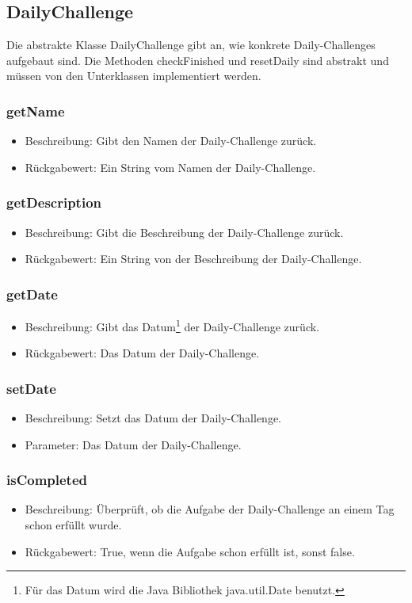 \documentclass[a4paper]{scrreprt}
\begin{document}
	\subsection{DailyChallenge}
	Die abstrakte Klasse DailyChallenge gibt an, wie konkrete Daily-Challenges aufgebaut sind. Die Methoden checkFinished und resetDaily sind abstrakt und müssen von den Unterklassen implementiert werden. \\

	\subsubsection{getName}
	\begin{itemize}
		\item Beschreibung: Gibt den Namen der Daily-Challenge zurück.
		\item Rückgabewert: Ein String vom Namen der Daily-Challenge.
	\end{itemize}
	\subsubsection{getDescription}
	\begin{itemize}
		\item Beschreibung: Gibt die Beschreibung der Daily-Challenge zurück.
		\item Rückgabewert: Ein String von der Beschreibung der Daily-Challenge.
	\end{itemize}
	\subsubsection{getDate}
	\begin{itemize}
		\item Beschreibung: Gibt das Datum\footnote{Für das Datum wird die Java Bibliothek java.util.Date benutzt.} der Daily-Challenge zurück.
		\item Rückgabewert: Das Datum der Daily-Challenge.
	\end{itemize}
	\subsubsection{setDate}
	\begin{itemize}
		\item Beschreibung: Setzt das Datum der Daily-Challenge.
		\item Parameter: Das Datum der Daily-Challenge.
	\end{itemize}
	\subsubsection{isCompleted}
	\begin{itemize}
		\item Beschreibung: Überprüft, ob die Aufgabe der Daily-Challenge an einem Tag schon erfüllt wurde.
		\item Rückgabewert: True, wenn die Aufgabe schon erfüllt ist, sonst false.
	\end{itemize}
\end{document}
